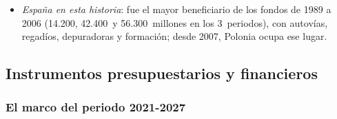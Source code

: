 \documentclass[11pt]{article}
\begin{document}
\begin{infografia}[H]
\centering
\caption{La política de cohesión en el tiempo: hitos y dotación de cada periodo}\label{figu:historia}
\end{infografia}

\begin{itemize}
\item \emph{España en esta historia}: fue el mayor beneficiario de los fondos de 1989 a 2006 (14.200, 42.400~y 56.300~millones en los 3~periodos), con autovías, regadíos, depuradoras y formación; desde 2007, Polonia ocupa ese lugar\nocite{CE2018Panorama64}.
\end{itemize}

\subsection{Instrumentos presupuestarios y financieros}\label{sec:instrumentos}

\subsubsection{El marco del periodo 2021-2027}\label{sec:marco-2021}
\end{document}
